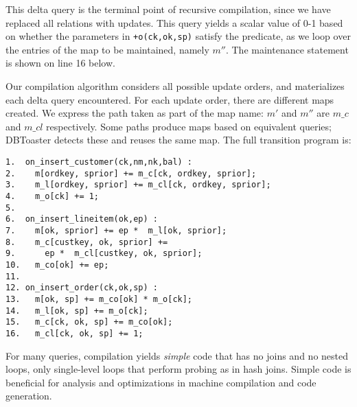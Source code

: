 {\noindent This delta query is the terminal point of recursive compilation, since
we have replaced all relations with updates. This query yields a scalar value of
0-1 based on whether the parameters in {\tt +o(ck,ok,sp)} satisfy the predicate,
as we loop over the entries of the map to be maintained, namely $m''$. The
maintenance statement is shown on line 16 below.


\noindent Our compilation algorithm considers all possible update orders, and
materializes each delta query encountered.  For each update order, there are different maps created.  We express the path taken as part of the map name: $m'$ and $m''$ are $m\_c$ and $m\_cl$ respectively.  Some paths produce maps based on equivalent queries; DBToaster detects these and reuses the same map.  The full transition program is:
}

{\footnotesize
\begin{verbatim}
1.  on_insert_customer(ck,nm,nk,bal) :
2.    m[ordkey, sprior] += m_c[ck, ordkey, sprior];
3.    m_l[ordkey, sprior] += m_cl[ck, ordkey, sprior];
4.    m_o[ck] += 1;
5. 
6.  on_insert_lineitem(ok,ep) :
7.    m[ok, sprior] += ep *  m_l[ok, sprior];
8.    m_c[custkey, ok, sprior] +=
9.      ep *  m_cl[custkey, ok, sprior];
10.   m_co[ok] += ep;
11.
12. on_insert_order(ck,ok,sp) :
13.   m[ok, sp] += m_co[ok] * m_o[ck]; 
14.   m_l[ok, sp] += m_o[ck];
15.   m_c[ck, ok, sp] += m_co[ok];
16.   m_cl[ck, ok, sp] += 1;
\end{verbatim}
}

For many queries, compilation yields \textit{simple} code that has no joins
and no nested loops, only single-level loops that perform probing as
in hash joins.
Simple code is beneficial for analysis and optimizations in machine
compilation and code generation.


